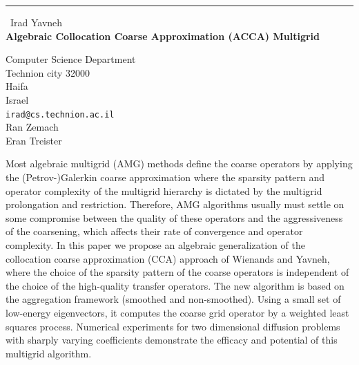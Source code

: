 \documentclass{report}
\begin{document}
\begin{center}
\rule{6in}{1pt} \
{\large Irad Yavneh \\
{\bf Algebraic Collocation Coarse Approximation (ACCA) Multigrid}}

Computer Science Department \\ Technion city 32000 \\ Haifa \\ Israel
\\
{\tt irad@cs.technion.ac.il}\\
Ran Zemach\\
Eran Treister\end{center}

Most algebraic multigrid (AMG) methods define the coarse operators by
applying the (Petrov-)Galerkin coarse
approximation where the sparsity pattern and operator complexity of the
multigrid hierarchy is
dictated by the multigrid prolongation and restriction. Therefore, AMG
algorithms usually must settle on some compromise between the quality of
these operators and the aggressiveness of the coarsening, which affects their
rate of convergence and operator complexity. In this paper we propose an
algebraic generalization of the
collocation coarse approximation (CCA) approach of Wienands and Yavneh,
where the choice of the sparsity pattern
of the coarse operators is independent of the choice of the high-quality
transfer operators. The new algorithm is based on the
aggregation framework (smoothed and non-smoothed). Using a small set of
low-energy eigenvectors, it computes the coarse grid operator
by a weighted least squares process. Numerical experiments for two
dimensional diffusion problems with sharply varying coefficients
demonstrate the efficacy and potential of this multigrid algorithm.
\end{document}
